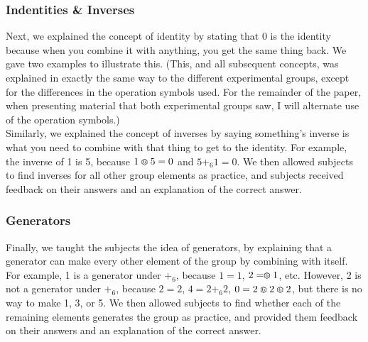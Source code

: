 \documentclass[11pt]{article}
\def\hex{\mathrel{%
    \mathchoice{\HEX}{\HEX}{\scriptsize\HEX}{\tiny\HEX}%
}}
\def\HEX{{%
    \setbox0\hbox{\varhexagon}%
    \rlap{\hbox to \wd0{\hss\raisebox{1 pt}{\scaleobj{0.6}{6}}\hss}}\box0
}}
\begin{document}
\subsubsection{Indentities \& Inverses}
Next, we explained the concept of identity by stating that 0 is the identity because when you combine it with anything, you get the same thing back. We gave two examples to illustrate this. (This, and all subsequent concepts, was explained in exactly the same way to the different experimental groups, except for the differences in the operation symbols used. For the remainder of the paper, when presenting material that both experimental groups saw, I will alternate use of the operation symbols.)\\[11pt]
Similarly, we explained the concept of inverses by saying something's inverse is what you need to combine with that thing to get to the identity. For example, the inverse of 1 is 5, because $1 \hex 5 = 0$ and $5 +_6 1 = 0$. We then allowed subjects to find inverses for all other group elements as practice, and subjects received feedback on their answers and an explanation of the correct answer.
\subsubsection{Generators}
Finally, we taught the subjects the idea of generators, by explaining that a generator can make every other element of the group by combining with itself. For example, 1 is a generator under $+_6$, because $1 = 1$, $2 = \hex 1$, etc. However, 2 is not a generator under $+_6$, because $2 = 2$, $4 = 2 +_6 2$, $0 = 2\hex 2 \hex 2$, but there is no way to make 1, 3, or 5. We then allowed subjects to find whether each of the remaining elements generates the group as practice, and provided them feedback on their answers and an explanation of the correct answer.
\end{document}
